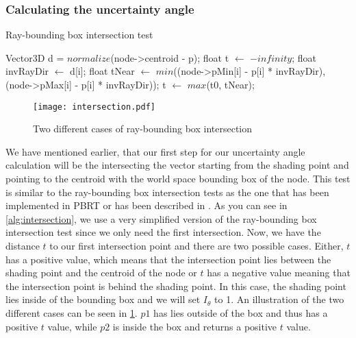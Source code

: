 \subsubsection{Calculating the uncertainty angle}

\begin{algorithm}
	\caption{Ray-bounding box intersection test}
	\label{alg:intersection}
	\begin{algorithmic}[1] %
		\State Vector3D d = $normalize$(node->centroid - p);
		\State float t $\gets$ $-infinity$;
		\State float invRayDir $\gets$ d[i];
		\State float tNear $\gets$ $min$((node->pMin[i] - p[i] * invRayDir), (node->pMax[i] - p[i] * invRayDir));
		\State t $\gets$ $max$(t0, tNear);
		\EndFor
	\end{algorithmic}
\end{algorithm}

\begin{figure}
	\begin{center}
		\texttt{[image: intersection.pdf]}
		\caption{Two different cases of ray-bounding box intersection}
		\label{fig:intersection}
	\end{center}
\end{figure}


We have mentioned earlier, that our first step for our uncertainty angle calculation will be the intersecting the vector starting from the shading point and pointing to the centroid with the world space bounding box of the node. This test is similar to the ray-bounding box intersection tests as the one that has been implemented in PBRT or has been described in \Cite{RBI1,RBI2}. As you can see in \ref{alg:intersection}, we use a very simplified version of the ray-bounding box intersection test since we only need the first intersection. Now, we have the distance $t$ to our first intersection point and there are two possible cases. Either, $t$ has a positive value, which means that the intersection point lies between the shading point and the centroid of the node or $t$ has a negative value meaning that the intersection point is behind the shading point. In this case, the shading point lies inside of the bounding box and we will set $I_\theta$ to 1. An illustration of the two different cases can be seen in \ref{fig:intersection}. $p1$ has lies outside of the box and thus has a positive $t$ value, while $p2$ is inside the box and returns a positive $t$ value.

